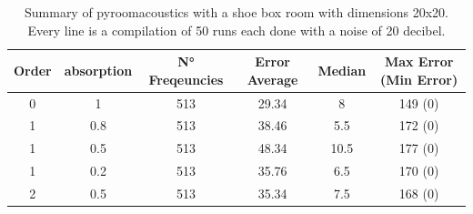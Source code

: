 \begin{table}[H]
   \centering
    \begin{tabular}{|c|c|c|c|c|c|}
      \hline
      Order & absorption & N° Freqeuncies & Error Average & Median & Max Error (Min Error) \\
      \hline
      0 & 1 & 513 & 29.34 & 8 & 149 (0) \\
      1 & 0.8 & 513 & 38.46 & 5.5 & 172 (0) \\
      1 & 0.5 & 513 & 48.34 & 10.5 & 177 (0) \\
      1 & 0.2 & 513 & 35.76 & 6.5 & 170 (0) \\
      2 & 0.5 & 513 & 35.34 & 7.5 & 168 (0) \\
      \hline
    \end{tabular}
    \caption{Summary of pyroomacoustics with a shoe box room with dimensions 20x20. Every line is a compilation of 50 runs each done with a noise of 20 decibel.}
    \label{table:py2}
\end{table}
